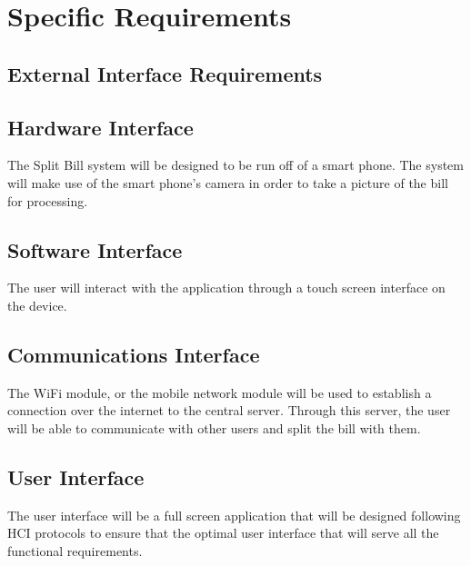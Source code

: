 \documentclass[12pt,a4paper]{article}
\begin{document}
   \section{Specific Requirements}
	\subsection{External Interface Requirements}
		\subsection{Hardware Interface}
		The Split Bill system will be designed to be run off of a smart phone. The system will make use of the smart phone's camera in order to take a picture of the bill for processing.
		\subsection{Software Interface}
		The user will interact with the application through a touch screen interface on the device.
		\subsection{Communications Interface}
		The WiFi module, or the mobile network module will be used to establish a connection over the internet to the central server. Through this server, the user will be able to communicate with other users and split the bill with them.
		\subsection{User Interface}
		The user interface will be a full screen application that will be designed following HCI protocols to ensure that the optimal user interface that will serve all the functional requirements.
\end{document}
